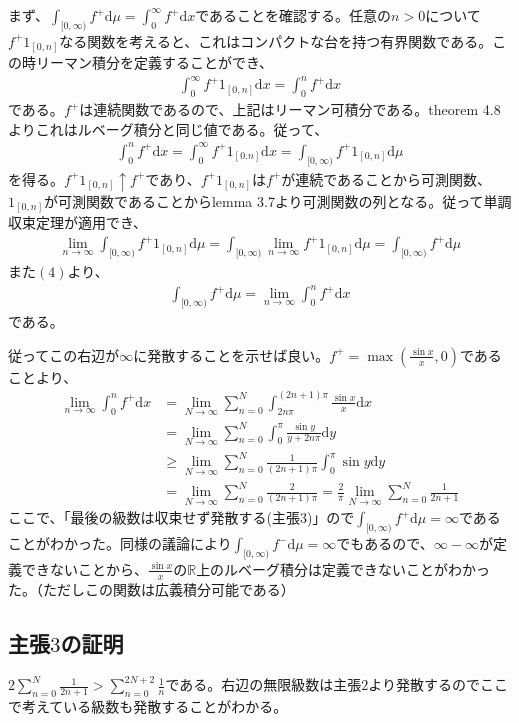 \documentclass{article}
\begin{document}
まず、$\int_{[0, \infty)} f^{+} \mathrm{d}\mu = \int_0^{\infty} f^{+} \mathrm{d}x$であることを確認する。任意の$n > 0$について$f^{+} 1_{[0, n]}$なる関数を考えると、これはコンパクトな台を持つ有界関数である。この時リーマン積分を定義することができ、
\begin{align*}
	\int_0^{\infty} f^{+} 1_{[0, n]} \mathrm{d}x = \int_0^n f^{+}\mathrm{d}x
\end{align*}
である。$f^{+}$は連続関数であるので、上記はリーマン可積分である。theorem 4.8よりこれはルベーグ積分と同じ値である。従って、
\begin{align}
	\int_0^n f^{+} \mathrm{d}x = \int_0^{\infty} f^{+} 1_{[0. n]}\mathrm{d}x = \int_{[0, \infty)} f^{+}1_{[0, n]} \mathrm{d}\mu
\end{align}
を得る。$f^{+} 1_{[0, n]} \uparrow f^{+}$であり、$f^{+} 1_{[0, n]}$は$f^{+}$が連続であることから可測関数、$1_{[0, n]}$が可測関数であることからlemma 3.7より可測関数の列となる。従って単調収束定理が適用でき、
\begin{align*}
	\lim_{n\to \infty} \int_{[0, \infty)} f^{+} 1_{[0, n]} \mathrm{d}\mu = \int_{[0, \infty)} \lim_{n\to \infty} f^{+} 1_{[0, n]} \mathrm{d}\mu = \int_{[0, \infty)}  f^{+}  \mathrm{d}\mu
\end{align*}
また$(4)$より、
\begin{align*}
	\int_{[0, \infty)}  f^{+}  \mathrm{d}\mu = \lim_{n\to \infty} \int_0^n f^{+} \mathrm{d}x
\end{align*}
である。

従ってこの右辺が$\infty$に発散することを示せば良い。$f^{+} = \max \left( \frac{\sin x}{x}, 0 \right)$であることより、
\begin{align*}
	\lim_{n\to \infty} \int_0^n f^{+} \mathrm{d}x &= \lim_{N \to \infty} \sum_{n = 0}^{N} \int_{2n\pi}^{(2n + 1)\pi} \frac{\sin x}{x} \mathrm{d}x\\[8pt]
	&= \lim_{N \to \infty} \sum_{n = 0}^{N} \int_0^{\pi} \frac{\sin y}{y + 2n\pi} \mathrm{d}y\\[8pt]
	&\geq  \lim_{N \to \infty} \sum_{n = 0}^{N} \frac{1}{(2n+1)\pi} \int_0^{\pi} \sin y \mathrm{d}y\\[8pt]
	&= \lim_{N \to \infty} \sum_{n = 0}^{N} \frac{2}{(2n + 1)\pi} = \frac{2}{\pi} \lim_{N \to \infty} \sum_{n = 0}^{N} \frac{1}{2n + 1}
\end{align*}
ここで、「最後の級数は収束せず発散する(主張$3$)」ので$\int_{[0, \infty)}  f^{+}  \mathrm{d}\mu = \infty$であることがわかった。同様の議論により$\int_{[0, \infty)}  f^{-}  \mathrm{d}\mu = \infty$でもあるので、$\infty -\infty$が定義できないことから、$\frac{\sin x}{x}$の$\mathbb{R}$上のルベーグ積分は定義できないことがわかった。（ただしこの関数は広義積分可能である）

\subsection{主張$3$の証明}
$2 \sum_{n = 0}^{N} \frac{1}{2n + 1} > \sum_{n = 0}^{2N + 2} \frac{1}{n}$である。右辺の無限級数は主張$2$より発散するのでここで考えている級数も発散することがわかる。
\end{document}
